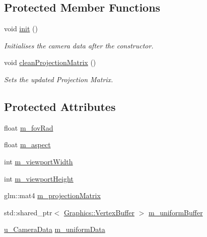 \subsection*{Protected Member Functions}
\begin{DoxyCompactItemize}
\item 
void \hyperlink{class_cookie_eng_1_1_object_1_1_camera_a25657d7f0704523a1fd10dd7e00d9d61}{init} ()
\begin{DoxyCompactList}\small\item\em Initialises the camera data after the constructor. \end{DoxyCompactList}\item 
void \hyperlink{class_cookie_eng_1_1_object_1_1_camera_ab685b627f1a3bc019ae68185d41ee38b}{clean\+Projection\+Matrix} ()
\begin{DoxyCompactList}\small\item\em Sets the updated Projection Matrix. \end{DoxyCompactList}\end{DoxyCompactItemize}
\subsection*{Protected Attributes}
\begin{DoxyCompactItemize}
\item 
float \hyperlink{class_cookie_eng_1_1_object_1_1_camera_ad9e63b2dc45a36cef1075909c5521d71}{m\+\_\+fov\+Rad}
\item 
float \hyperlink{class_cookie_eng_1_1_object_1_1_camera_a86c6f04a4f39bfa931493b1f6b9c013c}{m\+\_\+aspect}
\item 
int \hyperlink{class_cookie_eng_1_1_object_1_1_camera_a257e21bd91592e599162cd6bf0d618d6}{m\+\_\+viewport\+Width}
\item 
int \hyperlink{class_cookie_eng_1_1_object_1_1_camera_a5a65724cf71fe2ce24e4ee2071a4e068}{m\+\_\+viewport\+Height}
\item 
glm\+::mat4 \hyperlink{class_cookie_eng_1_1_object_1_1_camera_a6a5152fd8fbd92c4cbcc73d14511e584}{m\+\_\+projection\+Matrix}
\item 
std\+::shared\+\_\+ptr$<$ \hyperlink{class_cookie_eng_1_1_graphics_1_1_vertex_buffer}{Graphics\+::\+Vertex\+Buffer} $>$ \hyperlink{class_cookie_eng_1_1_object_1_1_camera_ae7715274f84e9b2e164c32a528989c3b}{m\+\_\+uniform\+Buffer}
\item 
\hyperlink{struct_cookie_eng_1_1_object_1_1u___camera_data}{u\+\_\+\+Camera\+Data} \hyperlink{class_cookie_eng_1_1_object_1_1_camera_acd3f4dab5ebb7b14b6e5ffd9704bccb6}{m\+\_\+uniform\+Data}
\end{DoxyCompactItemize}



